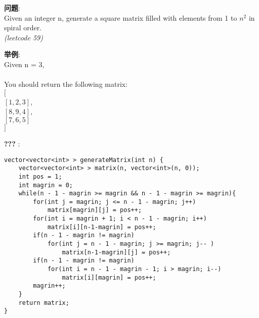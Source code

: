     
\begin{description}
    \item{\textbf{问题}}:\\
Given an integer n, generate a square matrix filled with elements from 1 to $n^2$ in spiral order.\\
\textit{(leetcode 59)}
    \item{\textbf{举例}}:\\
Given n = 3,\\
\\
You should return the following matrix:\\
$[$ \\
 $[ 1, 2, 3 ]$, \\
 $[ 8, 9, 4 ]$, \\
 $[ 7, 6, 5 ]$ \\
$]$
    \item{\textbf{???}} : 
    \begin{lstlisting}
vector<vector<int> > generateMatrix(int n) {
	vector<vector<int> > matrix(n, vector<int>(n, 0));
	int pos = 1;
	int magrin = 0;
	while(n - 1 - magrin >= magrin && n - 1 - magrin >= magrin){
		for(int j = magrin; j <= n - 1 - magrin; j++)
			matrix[magrin][j] = pos++;
		for(int i = magrin + 1; i < n - 1 - magrin; i++)
			matrix[i][n-1-magrin] = pos++;
		if(n - 1 - magrin != magrin)
			for(int j = n - 1 - magrin; j >= magrin; j-- )
				matrix[n-1-magrin][j] = pos++;
		if(n - 1 - magrin != magrin)
			for(int i = n - 1 - magrin - 1; i > magrin; i--)
				matrix[i][magrin] = pos++;
		magrin++;
	}
	return matrix;
}
    \end{lstlisting}
\end{description}
